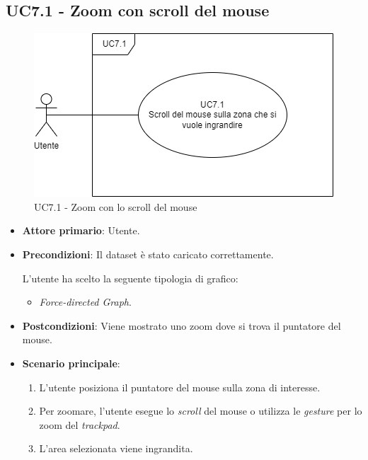 \subsection{UC7.1 - Zoom con scroll del mouse}
\label{sec:UC7.1}
\begin{figure}[h!]
    \centering
    \includegraphics[scale=0.55]{../../assets/zoom_mouse.png}
    \caption{UC7.1 - Zoom con lo scroll del mouse}
\end{figure}
\begin{itemize}
    \item \textbf{Attore primario}: Utente.
    \item \textbf{Precondizioni}: Il dataset è stato caricato correttamente. \par L'utente ha scelto la seguente tipologia di grafico:
    \begin{itemize}
          \item \textit{Force-directed Graph}.
    \end{itemize}
    \item \textbf{Postcondizioni}: Viene mostrato uno zoom dove si trova il puntatore del mouse.
    \item \textbf{Scenario principale}:
          \begin{enumerate}
              \item L'utente posiziona il puntatore del mouse sulla zona di interesse.
              \item Per zoomare, l'utente esegue lo \textit{scroll} del mouse o utilizza le \textit{gesture} per lo zoom del \textit{trackpad}.
              \item L'area selezionata viene ingrandita.
          \end{enumerate}
\end{itemize}

\newpage

